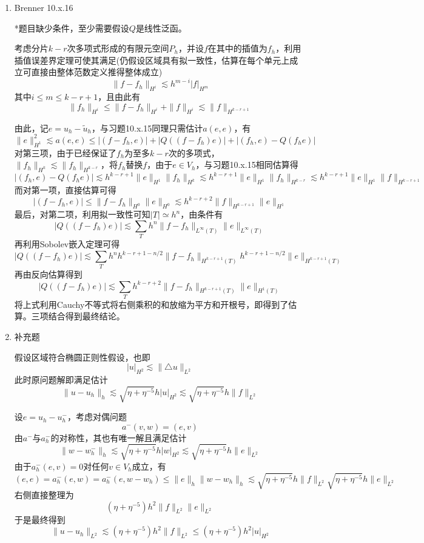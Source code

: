\documentclass[a4paper,UTF8,fontset=windows,10pt]{ctexart}
\begin{document}
\begin{enumerate}
    \item Brenner 10.x.16
    
    *题目缺少条件，至少需要假设$Q$是线性泛函。
    
    考虑分片$k-r$次多项式形成的有限元空间$P_h$，并设$f$在其中的插值为$f_h$，利用插值误差界定理可使其满足(仍假设区域具有拟一致性，估算在每个单元上成立可直接由整体范数定义推得整体成立)
    $$\|f-f_h\|_{H^i}\lesssim h^{m-i}|f|_{H^m}$$
    其中$i\le m\le k-r+1$，且由此有
    $$\|f_h\|_{H^i}\le\|f-f_h\|_{H^i}+\|f\|_{H^i}\lesssim\|f\|_{H^{k-r+1}}$$
    
    由此，记$e=u_h-\tilde{u}_h$，与习题10.x.15同理只需估计$a(e,e)$，有
    $$\|e\|_{H^1}^2\lesssim a(e,e)\le|(f-f_h,e)|+|Q((f-f_h)e)|+|(f_h,e)-Q(f_he)|$$
    对第三项，由于已经保证了$f_h$为至多$k-r$次的多项式，$\|f_h\|_{H^k}\lesssim\|f_h\|_{H^{k-r}}$，将$f_h$替换$f$，由于$e\in V_h$，与习题10.x.15相同估算得
    $$|(f_h,e)-Q(f_he)|\lesssim h^{k-r+1}\|e\|_{H^1}\|f_h\|_{H^k}\lesssim h^{k-r+1}\|e\|_{H^1}\|f_h\|_{H^{k-r}}\lesssim h^{k-r+1}\|e\|_{H^1}\|f\|_{H^{k-r+1}}$$
    而对第一项，直接估算可得
    $$|(f-f_h,e)|\le\|f-f_h\|_{H^0}\|e\|_{H^0}\lesssim h^{k-r+2}\|f\|_{H^{k-r+1}}\|e\|_{H^1}$$
    最后，对第二项，利用拟一致性可知$|T|\simeq h^n$，由条件有
    $$|Q((f-f_h)e)|\lesssim\sum_Th^n\|f-f_h\|_{L^\infty(T)}\|e\|_{L^\infty(T)}$$
    再利用Sobolev嵌入定理可得
    $$|Q((f-f_h)e)|\lesssim\sum_Th^nh^{k-r+1-n/2}\|f-f_h\|_{H^{k-r+1}(T)}h^{k-r+1-n/2}\|e\|_{H^{k-r+1}(T)}$$
    再由反向估算得到
    $$|Q((f-f_h)e)|\lesssim\sum_Th^{k-r+2}\|f-f_h\|_{H^{k-r+1}(T)}\|e\|_{H^1(T)}$$
    将上式利用Cauchy不等式将右侧乘积的和放缩为平方和开根号，即得到了估算。三项结合得到最终结论。
    
    \item 补充题
    
    假设区域符合椭圆正则性假设，也即
    $$|u|_{H^2}\lesssim\|\triangle u\|_{L^2}$$
    此时原问题解即满足估计
    $$\|u-u_h\|_h\lesssim\sqrt{\eta+\eta^{-5}}h|u|_{H^2}\lesssim\sqrt{\eta+\eta^{-5}}h\|f\|_{L^2}$$
    
    设$e=u_h-u_h^-$，考虑对偶问题
    $$a^-(v,w)=(e,v)$$
    由$a^-$与$a_h^-$的对称性，其也有唯一解且满足估计
    $$\|w-w_h^-\|_h\lesssim\sqrt{\eta+\eta^{-5}}h|w|_{H^2}\lesssim\sqrt{\eta+\eta^{-5}}h\|e\|_{L^2}$$
    由于$a_h^-(e,v)=0$对任何$v\in V_h$成立，有
    $$(e,e)=a_h^-(e,w)=a_h^-(e,w-w_h)\le\|e\|_h\|w-w_h\|_h\lesssim\sqrt{\eta+\eta^{-5}}h\|f\|_{L^2}\sqrt{\eta+\eta^{-5}}h\|e\|_{L^2}$$
    右侧直接整理为
    $$(\eta+\eta^{-5})h^2\|f\|_{L^2}\|e\|_{L^2}$$
    于是最终得到
    $$\|u-u_h\|_{L^2}\lesssim(\eta+\eta^{-5})h^2\|f\|_{L^2}\le(\eta+\eta^{-5})h^2|u|_{H^2}$$
\end{enumerate}
\end{document}
